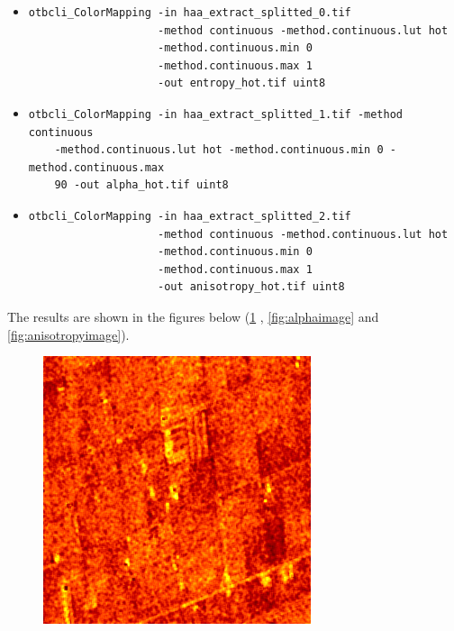 \begin{itemize}
\item 
\begin{verbatim} 
otbcli_ColorMapping -in haa_extract_splitted_0.tif 
                    -method continuous -method.continuous.lut hot 
                    -method.continuous.min 0 
                    -method.continuous.max 1
                    -out entropy_hot.tif uint8 
\end{verbatim}
									  
\item 
\begin{verbatim} 
otbcli_ColorMapping -in haa_extract_splitted_1.tif -method continuous 
    -method.continuous.lut hot -method.continuous.min 0 -method.continuous.max
    90 -out alpha_hot.tif uint8 
\end{verbatim}
									  
\item 
\begin{verbatim} 
otbcli_ColorMapping -in haa_extract_splitted_2.tif 
                    -method continuous -method.continuous.lut hot 
                    -method.continuous.min 0 
                    -method.continuous.max 1
                    -out anisotropy_hot.tif uint8 
\end{verbatim}
\end{itemize}

The results are shown in the figures below (\ref{fig:entropyimage}
, \ref{fig:alphaimage} and \ref{fig:anisotropyimage}).
\begin{figure}[!h]
\center
\includegraphics[width=0.7\textwidth]{../Art/entropyhot.png}
\label{fig:entropyimage}
\end{figure}

